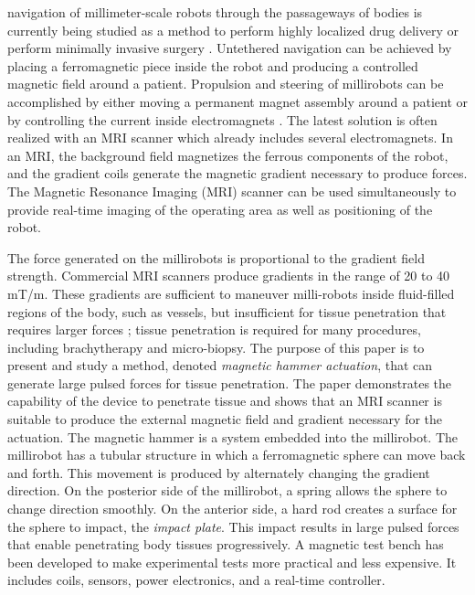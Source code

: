 \documentclass[letterpaper, 10 pt, journal, twoside]{ieeetran}
\begin{document}
 navigation of millimeter-scale robots through the passageways of bodies is currently being studied as a method to perform highly localized drug delivery or perform minimally invasive surgery \cite{7067029,702,mi2020295}. Untethered navigation can be achieved by placing a ferromagnetic piece inside the robot and producing a controlled magnetic field around a patient. Propulsion and steering of millirobots can be accomplished by either moving a permanent magnet assembly around a patient \cite{taylor} or by controlling the current inside electromagnets \cite{MRM21638}. The latest solution is often realized with an MRI scanner which already includes several electromagnets. In an MRI, the background field magnetizes the ferrous components of the robot, and the gradient coils generate the magnetic gradient necessary to produce forces. 
The Magnetic Resonance Imaging (MRI) scanner can be used simultaneously to provide real-time imaging of the operating area as well as positioning of the robot.\par
The force generated on the millirobots is proportional to the gradient field  strength. 
Commercial MRI scanners produce gradients in the range of 20 to 40 mT/m. 
These gradients are sufficient to maneuver milli-robots inside fluid-filled regions of the body, such as vessels, \cite{martel2007automatic} but insufficient for tissue penetration that requires larger forces \cite{7139341}; tissue penetration is required for many procedures, including brachytherapy and micro-biopsy.
The purpose of this paper is to present and study a method, denoted  \emph{magnetic hammer actuation}, that can generate large pulsed forces for tissue penetration. The paper demonstrates the capability of the device to penetrate tissue and shows that an MRI scanner is suitable to produce the external magnetic field and gradient necessary for the actuation.
The magnetic hammer is a system embedded into the millirobot. 
The millirobot has a tubular structure in which a ferromagnetic sphere can move back and forth.
 This movement is produced by alternately changing the gradient direction. 
 On the posterior side of the millirobot, a spring allows the sphere to change direction smoothly. 
 On the anterior side, a hard rod creates a surface for the sphere to impact, the \emph{impact plate}.
  This impact results in large pulsed forces that enable penetrating body tissues progressively.
A magnetic test bench has been developed to make experimental tests more practical and less expensive.
 It includes coils, sensors, power electronics, and a real-time controller.\par
\end{document}
